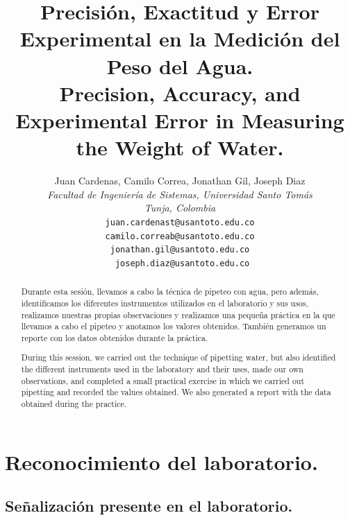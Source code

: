 \documentclass[letterpaper]{IEEEconf}
\title{\LARGE %
Precisión, Exactitud y Error Experimental en la Medición del Peso del Agua.\\
\foreignlanguage{english}{Precision, Accuracy, and Experimental Error in Measuring the Weight of Water.}
}
\author{
Juan Cardenas, Camilo Correa, Jonathan Gil, Joseph Diaz\\
\emph{Facultad de Ingeniería de Sistemas, Universidad Santo Tomás}\\
\emph{Tunja, Colombia}\\
\texttt{juan.cardenast@usantoto.edu.co}\\
\texttt{camilo.correab@usantoto.edu.co}\\
\texttt{jonathan.gil@usantoto.edu.co}\\
\texttt{ joseph.diaz@usantoto.edu.co}\\
}
\date{} %
\begin{document}
\maketitle

\begin{abstract}
\textnormal{Durante esta sesión, llevamos a cabo la técnica de pipeteo con agua, pero además, identificamos los diferentes instrumentos utilizados en el laboratorio y sus usos, realizamos nuestras propias observaciones y realizamos una pequeña práctica en la que llevamos a cabo el pipeteo y anotamos los valores obtenidos. También generamos un reporte con los datos obtenidos durante la práctica.}
\end{abstract}

\begin{otherlanguage}{english}
\begin{abstract}
\textnormal{During this session, we carried out the technique of pipetting water, but also identified the different instruments used in the laboratory and their uses, made our own observations, and completed a small practical exercise in which we carried out pipetting and recorded the values obtained. We also generated a report with the data obtained during the practice.}
\end{abstract}
\end{otherlanguage}

\section{Reconocimiento del laboratorio.}
\subsection{Señalización presente en el laboratorio. \cite{Seglab}}
\end{document}
